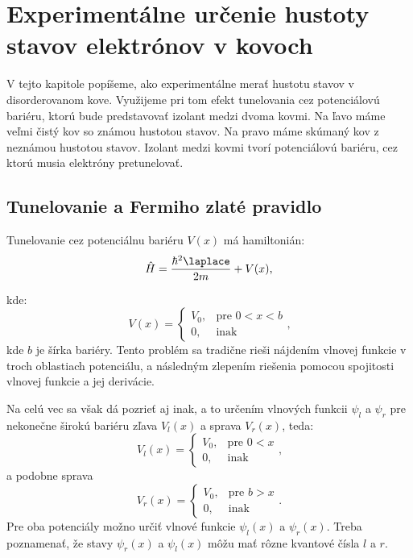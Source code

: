 
\section{Experimentálne určenie hustoty stavov elektrónov v kovoch}
V tejto kapitole popíšeme, ako experimentálne merať hustotu stavov v disorderovanom kove. Využijeme pri tom efekt tunelovania cez 
potenciálovú bariéru, ktorú bude predstavovať izolant medzi dvoma kovmi. Na ľavo máme veľmi čistý kov so známou hustotou stavov.
Na pravo máme skúmaný kov z neznámou hustotou stavov. Izolant medzi kovmi tvorí potenciálovú bariéru, cez ktorú musia elektróny pretunelovať. 
\subsection{Tunelovanie a Fermiho zlaté pravidlo}
Tunelovanie cez potenciálnu bariéru $V(x)$ má hamiltonián:
\begin{equation}
 \label{eq:exp_barrier}
 \hat{H}=\frac{\hbar^2 \laplace }{2m}+V(x) \text{,}
\end{equation} 

kde:
\begin{equation}
 \label{eq:exp_potential_barrier}
 V(x)=
 \begin{cases}
    V_0,& \text{pre } 0<x<b\\
    0,              & \text{inak}
\end{cases}\text{,}
\end{equation} 
kde $b$ je šírka bariéry. Tento problém sa tradične rieši nájdením vlnovej funkcie v troch oblastiach potenciálu, a následným zlepením
riešenia pomocou spojitosti vlnovej funkcie a jej derivácie.

Na celú vec sa však dá pozrieť aj inak, a to určením vlnových funkcii $\psi_l$ a $\psi_r$ pre nekonečne širokú bariéru zľava $V_l(x)$ a  
sprava $V_r(x)$, teda:
\begin{equation}
 \label{eq:exp_potential_left}
 V_l(x)=
 \begin{cases}
    V_0,& \text{pre } 0<x\\
    0,              & \text{inak}
\end{cases}\text{,}
\end{equation} 
a podobne sprava
\begin{equation}
 \label{eq:exp_potential_right}
 V_r(x)=
 \begin{cases}
    V_0,& \text{pre } b>x\\
    0,              & \text{inak}
\end{cases}\text{.}
\end{equation} 
Pre oba potenciály možno určiť vlnové funkcie   $\psi_l(x)$ a $\psi_r(x)$.  Treba poznamenať, že stavy $\psi_r(x)$ a $\psi_l(x)$ 
môžu mať rôzne kvantové čísla $l$ a $r$.

